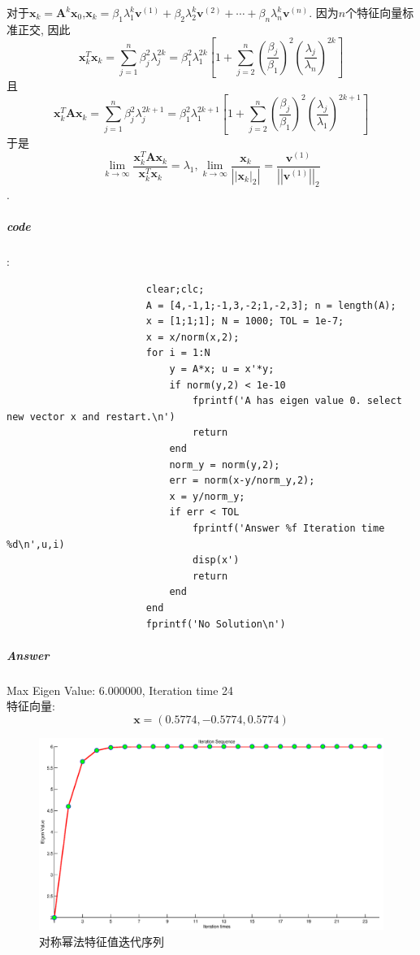 \documentclass{article}
\begin{document}
\begin{CJK*}{UTF8}{song}
					对于$\mathbf{x}_k = \mathbf{A}^k \mathbf{x}_0$,$\mathbf{x}_k = \beta_1 \lambda_1^k \mathbf{v}^{\left(1\right)} + \beta_2 \lambda_2^k \mathbf{v}^{\left(2\right)} + \cdots + \beta_n \lambda_n^k \mathbf{v}^{\left(n\right)}$.
					因为$n$个特征向量标准正交, 因此
					$$\mathbf{x}_k^T \mathbf{x}_k = \sum_{j=1}^{n} \beta_j^2 \lambda_j^{2k} = \beta_1^2 \lambda_1^{2k} \left[1 + \sum_{j=2}^{n}\left(\frac{\beta_j}{\beta_1}\right)^2 \left(\frac{\lambda_j}{\lambda_n} \right)^{2k} \right]$$
					且
					$$ \mathbf{x}_k^{T} \mathbf{A} \mathbf{x}_k = \sum_{j=1}^{n} \beta_j^2 \lambda_j^{2k+1} = \beta_1^2 \lambda_1^{2k+1} \left[ 1 + \sum_{j=2}^{n} \left(\frac{\beta_j}{\beta_1}\right)^2 \left(\frac{\lambda_j}{\lambda_1}\right)^{2k+1} \right] $$
					于是
					$$\lim\limits_{k \to \infty} \frac{\mathbf{x}_k^T \mathbf{A} \mathbf{x}_k}{\mathbf{x}_k^T \mathbf{x}_k} = \lambda_1, \lim\limits_{k \to \infty} \frac{\mathbf{x}_k}{\left|\left|\mathbf{x}_k \right|_{2} \right|} = \frac{\mathbf{v}^{\left(1\right)}}{\left|\left|\mathbf{v}^{\left(1\right)} \right| \right|_2}$$.
				\subparagraph{code}
					:\newline
					\begin{lstlisting}
						clear;clc;
						A = [4,-1,1;-1,3,-2;1,-2,3]; n = length(A);
						x = [1;1;1]; N = 1000; TOL = 1e-7;
						x = x/norm(x,2);
						for i = 1:N
							y = A*x; u = x'*y;
							if norm(y,2) < 1e-10
								fprintf('A has eigen value 0. select new vector x and restart.\n')
								return
							end
							norm_y = norm(y,2);
							err = norm(x-y/norm_y,2);
							x = y/norm_y;
							if err < TOL
								fprintf('Answer %f Iteration time %d\n',u,i)
								disp(x')
								return
							end
						end
						fprintf('No Solution\n')
					\end{lstlisting}
				\subparagraph{Answer}
					Max Eigen Value: 6.000000, Iteration time 24 \\
					特征向量: $$\mathbf{x} = \left(0.5774,-0.5774,0.5774\right)$$
					\begin{figure}[H]
						\centering
						\includegraphics[width=1.0\textwidth]{../chapter_9_2.eps}
						\caption{对称幂法特征值迭代序列}
						\label{img_chapter9_2}
					\end{figure}

\end{CJK*}
\end{document}
